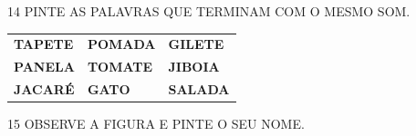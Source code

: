 \begin{escola}
\num{14} PINTE AS PALAVRAS QUE TERMINAM COM O MESMO SOM.

\begin{longtable}[]{@{}lll@{}}
\toprule
\textbf{TAPETE} & \textbf{POMADA} & \textbf{GILETE}\tabularnewline
\textbf{PANELA} & \textbf{TOMATE} & \textbf{JIBOIA}\tabularnewline
\textbf{JACARÉ} & \textbf{GATO} & \textbf{SALADA}\tabularnewline
\bottomrule
\end{longtable}

\num{15} OBSERVE A FIGURA E PINTE O SEU NOME.







\end{escola}
